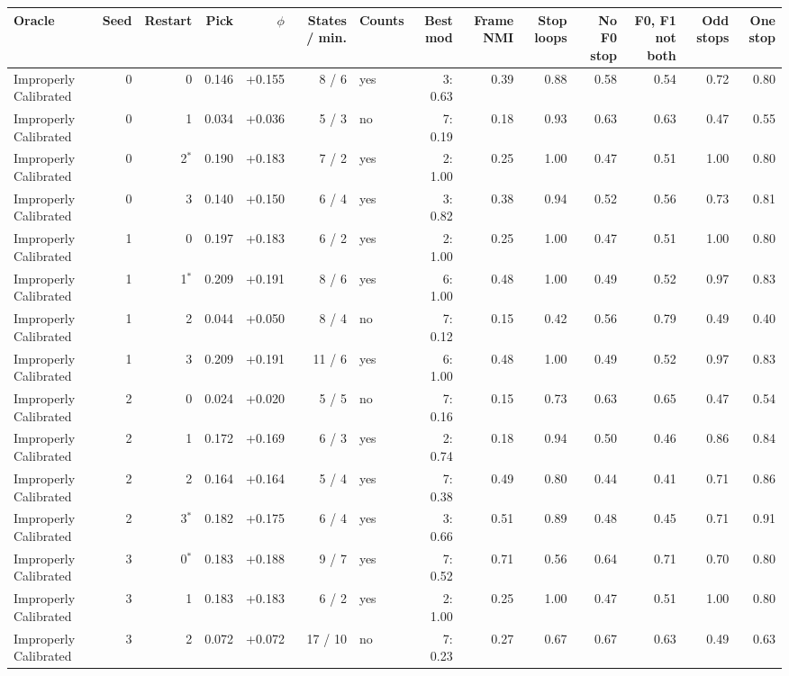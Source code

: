 \begin{tabular}{lrrrrrlrrrrrrr}
\toprule
Oracle & Seed & Restart & Pick & $\phi$ & States / min. & Counts & Best mod & Frame NMI & Stop loops & No F0 stop & F0, F1 not both & Odd stops & One stop \\
\midrule
Improperly Calibrated & 0 & 0 & 0.146 & +0.155 & 8 / 6 & yes & 3: 0.63 & 0.39 & 0.88 & 0.58 & 0.54 & 0.72 & 0.80 \\
Improperly Calibrated & 0 & 1 & 0.034 & +0.036 & 5 / 3 & no & 7: 0.19 & 0.18 & 0.93 & 0.63 & 0.63 & 0.47 & 0.55 \\
Improperly Calibrated & 0 & 2$^*$ & 0.190 & +0.183 & 7 / 2 & yes & 2: 1.00 & 0.25 & 1.00 & 0.47 & 0.51 & 1.00 & 0.80 \\
Improperly Calibrated & 0 & 3 & 0.140 & +0.150 & 6 / 4 & yes & 3: 0.82 & 0.38 & 0.94 & 0.52 & 0.56 & 0.73 & 0.81 \\
Improperly Calibrated & 1 & 0 & 0.197 & +0.183 & 6 / 2 & yes & 2: 1.00 & 0.25 & 1.00 & 0.47 & 0.51 & 1.00 & 0.80 \\
Improperly Calibrated & 1 & 1$^*$ & 0.209 & +0.191 & 8 / 6 & yes & 6: 1.00 & 0.48 & 1.00 & 0.49 & 0.52 & 0.97 & 0.83 \\
Improperly Calibrated & 1 & 2 & 0.044 & +0.050 & 8 / 4 & no & 7: 0.12 & 0.15 & 0.42 & 0.56 & 0.79 & 0.49 & 0.40 \\
Improperly Calibrated & 1 & 3 & 0.209 & +0.191 & 11 / 6 & yes & 6: 1.00 & 0.48 & 1.00 & 0.49 & 0.52 & 0.97 & 0.83 \\
Improperly Calibrated & 2 & 0 & 0.024 & +0.020 & 5 / 5 & no & 7: 0.16 & 0.15 & 0.73 & 0.63 & 0.65 & 0.47 & 0.54 \\
Improperly Calibrated & 2 & 1 & 0.172 & +0.169 & 6 / 3 & yes & 2: 0.74 & 0.18 & 0.94 & 0.50 & 0.46 & 0.86 & 0.84 \\
Improperly Calibrated & 2 & 2 & 0.164 & +0.164 & 5 / 4 & yes & 7: 0.38 & 0.49 & 0.80 & 0.44 & 0.41 & 0.71 & 0.86 \\
Improperly Calibrated & 2 & 3$^*$ & 0.182 & +0.175 & 6 / 4 & yes & 3: 0.66 & 0.51 & 0.89 & 0.48 & 0.45 & 0.71 & 0.91 \\
Improperly Calibrated & 3 & 0$^*$ & 0.183 & +0.188 & 9 / 7 & yes & 7: 0.52 & 0.71 & 0.56 & 0.64 & 0.71 & 0.70 & 0.80 \\
Improperly Calibrated & 3 & 1 & 0.183 & +0.183 & 6 / 2 & yes & 2: 1.00 & 0.25 & 1.00 & 0.47 & 0.51 & 1.00 & 0.80 \\
Improperly Calibrated & 3 & 2 & 0.072 & +0.072 & 17 / 10 & no & 7: 0.23 & 0.27 & 0.67 & 0.67 & 0.63 & 0.49 & 0.63 \\

\end{tabular}

